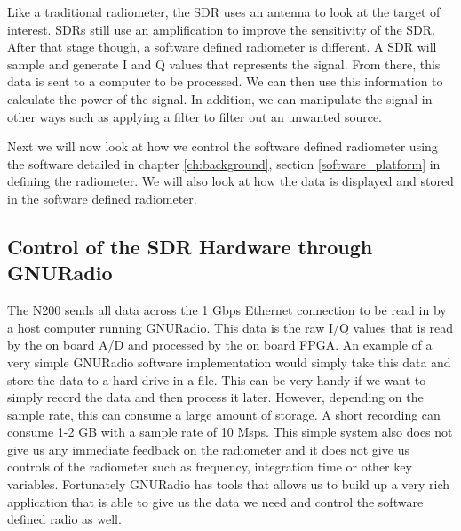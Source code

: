 Like a traditional radiometer, the SDR uses an antenna to look at the target of interest.  SDRs still use an amplification to improve the sensitivity of the SDR. After that stage though, a software defined radiometer is different.  A SDR will sample and generate I and Q values that represents the signal.  From there, this data is sent to a computer to be processed.  We can then use this information to calculate the power of the signal.  In addition, we can manipulate the signal in other ways such as applying a filter to filter out an unwanted source.



Next we will now look at how we control the software defined radiometer using the software detailed in chapter \ref{ch:background}, section \ref{software_platform} in defining the radiometer.  We will also look at how the data is displayed and stored in the software defined radiometer.

\subsection{Control of the SDR Hardware through GNURadio}
The N200 sends all data across the 1 Gbps Ethernet connection to be read in by a host computer running GNURadio.  This data is the raw I/Q values that is read by the on board A/D and processed by the on board FPGA.  An example of a very simple GNURadio software implementation would simply take this data and store the data to a hard drive in a file.  This can be very handy if we want to simply record the data and then process it later.  However, depending on the sample rate, this can consume a large amount of storage.  A short recording can  consume 1-2 GB with a sample rate of 10 Msps.  This simple system also does not give us any immediate feedback on the radiometer and it does not give us controls of the radiometer such as frequency, integration time or other key variables.  Fortunately GNURadio has tools that allows us to build up a very rich application that is able to give us the data we need and control the software defined radio as well.

